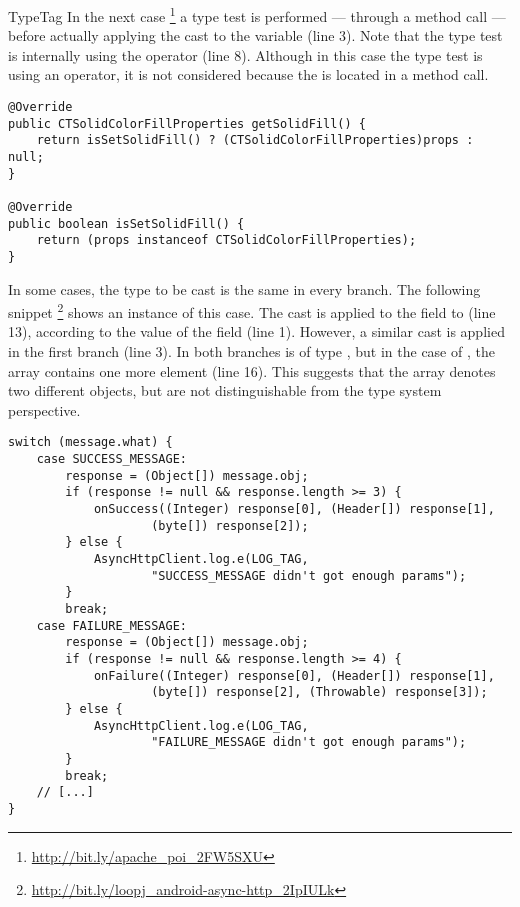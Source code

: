 \begin{pattern}{TypeTag}
%
In the next case%
\footnote{\url{http://bit.ly/apache_poi_2FW5SXU}}
a type test is performed --- through a method call --- before actually applying the cast to the variable  (line 3).
Note that the type test is internally using the  operator (line 8).
Although in this case the type test is using an  operator,
it is not considered  because the  is located in a method call.

\begin{verbatim}
@Override
public CTSolidColorFillProperties getSolidFill() {
    return isSetSolidFill() ? (CTSolidColorFillProperties)props : null;
}

@Override
public boolean isSetSolidFill() {
    return (props instanceof CTSolidColorFillProperties);
}
\end{verbatim}

In some cases, the type to be cast is the same in every branch.
The following snippet%
\footnote{\url{http://bit.ly/loopj_android-async-http_2IpIULk}}
shows an instance of this case.
The cast is applied to the  field to (line 13),
according to the value of the  field (line 1).
However, a similar cast is applied in the first branch (line 3).
In both branches  is of type ,
but in the case of ,
the array contains one more element (line 16).
This suggests that the  array denotes two different objects,
but are not distinguishable from the type system perspective.

\begin{verbatim}
switch (message.what) {
    case SUCCESS_MESSAGE:
        response = (Object[]) message.obj;
        if (response != null && response.length >= 3) {
            onSuccess((Integer) response[0], (Header[]) response[1],
                    (byte[]) response[2]);
        } else {
            AsyncHttpClient.log.e(LOG_TAG, 
                    "SUCCESS_MESSAGE didn't got enough params");
        }
        break;
    case FAILURE_MESSAGE:
        response = (Object[]) message.obj;
        if (response != null && response.length >= 4) {
            onFailure((Integer) response[0], (Header[]) response[1],
                    (byte[]) response[2], (Throwable) response[3]);
        } else {
            AsyncHttpClient.log.e(LOG_TAG,
                    "FAILURE_MESSAGE didn't got enough params");
        }
        break;
    // [...]
}
\end{verbatim}



\end{pattern}
